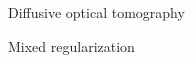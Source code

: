 \documentclass[11pt]{article}%
\renewcommand{\_}{{\fontfamily{ptm}\selectfont\textunderscore}}
\theoremstyle{plain}
\numberwithin{equation}{section}
\begin{document}
\begin{section}{Diffusive optical tomography}
%

\begin{subsection}{Mixed regularization}


\end{subsection}
\end{section}
\end{document}
